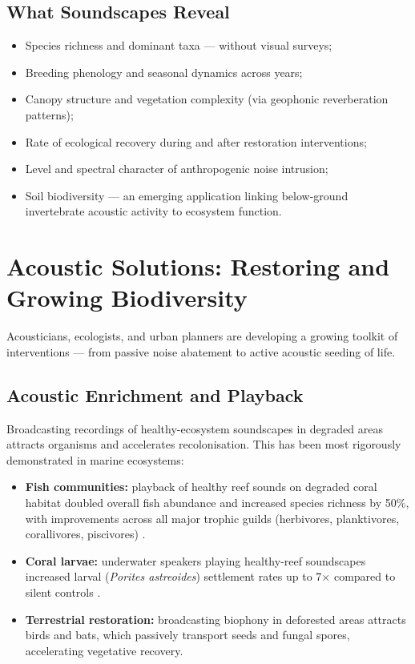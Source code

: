 \documentclass[12pt, a4paper]{article}
\begin{document}
\subsection{What Soundscapes Reveal}

\begin{itemize}[itemsep=3pt]
  \item Species richness and dominant taxa --- without visual surveys;
  \item Breeding phenology and seasonal dynamics across years;
  \item Canopy structure and vegetation complexity (via geophonic reverberation patterns);
  \item Rate of ecological recovery during and after restoration interventions;
  \item Level and spectral character of anthropogenic noise intrusion;
  \item Soil biodiversity --- an emerging application linking below-ground invertebrate
        acoustic activity to ecosystem function.
\end{itemize}

\newpage

\section{Acoustic Solutions: Restoring and Growing Biodiversity}

Acousticians, ecologists, and urban planners are developing a growing toolkit of interventions
--- from passive noise abatement to active acoustic seeding of life.

\subsection{Acoustic Enrichment and Playback}

Broadcasting recordings of healthy-ecosystem soundscapes in degraded areas attracts organisms
and accelerates recolonisation. This has been most rigorously demonstrated in marine ecosystems:

\begin{itemize}[itemsep=3pt]
  \item \textbf{Fish communities:} playback of healthy reef sounds on degraded coral habitat
        doubled overall fish abundance and increased species richness by 50\%, with
        improvements across all major trophic guilds (herbivores, planktivores, corallivores,
        piscivores) \citep{timber2019}.
  \item \textbf{Coral larvae:} underwater speakers playing healthy-reef soundscapes increased
        larval (\textit{Porites astreoides}) settlement rates up to 7$\times$ compared to
        silent controls \citep{vermeij2010}.
  \item \textbf{Terrestrial restoration:} broadcasting biophony in deforested areas attracts
        birds and bats, which passively transport seeds and fungal spores, accelerating
        vegetative recovery.
\end{itemize}
\end{document}
